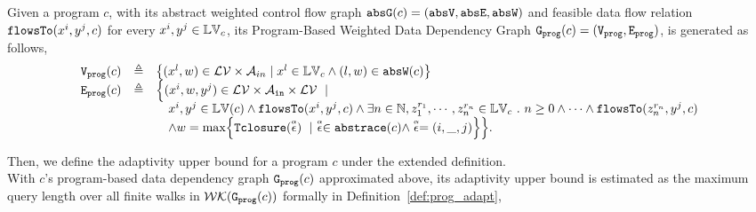 \begin{defn}
  \label{def:improved_prog_graph}
Given a program $c$, with its abstract weighted control flow graph $\mathtt{abs}{\mathtt{G}}(c) = (\mathtt{abs}{\mathtt{V}}, \mathtt{abs}{\mathtt{E}}, \mathtt{abs}{\mathtt{W}})$ and 
feasible data flow relation $\mathtt{flowsTo}(x^i, y^j, c)$ for every $x^i, y^j \in \mathbb{LV}_c$, its Program-Based Weighted Data Dependency Graph
$\mathtt{{G_{prog}}}(c) = (\mathtt{{V_{prog}}}, \mathtt{{E_{prog}}})$,
is generated as follows,
{\footnotesize
\[
\begin{array}{lcl}
\progV(c) & \triangleq &
\left\{ (x^l, w) \in  \mathcal{LV} \times \mathcal{A}_{in}
\mid
x^l \in \lvar_{{c}} \land (l, w) \in \absW(c)
\right\}
\\
\progE(c) & \triangleq &
   \Big\{ (x^i, w, y^j) \in \mathcal{LV} \times 
   \mathcal{A}_{\kw{in}} \times \mathcal{LV}
~\mid~
  \\ & & \quad 
x^i, y^j \in \lvar(c) \land \flowsto(x^i, y^j, c) \land
  \exists n \in \mathbb{N}, z_1^{r_1}, \cdots, z_n^{r_n} \in \lvar_{{c}} \sthat 
  n \geq 0 
  \land \cdots \land \flowsto(z_n^{r_n}, y^j, c) 
  \\ & & \quad 
  \land
  w = \max \left\{ \absclr(\absevent) ~\mid~ \absevent \in \absflow(c) \land \absevent = (i, \_, j) \right\} 
\Big\}.
\end{array}
\] }
\end{defn}
Then, we define the adaptivity upper bound for a program $c$ under the extended definition.
\\
With
$c$'s program-based data dependency graph $\mathtt{{G_{prog}}}({c})$ approximated above,
%
its adaptivity upper bound 
%
is estimated as
the maximum query length over all finite walks in $\mathcal{WK}(\mathtt{{G_{prog}}}({c}))$ formally in Definition~\ref{def:prog_adapt}, 
